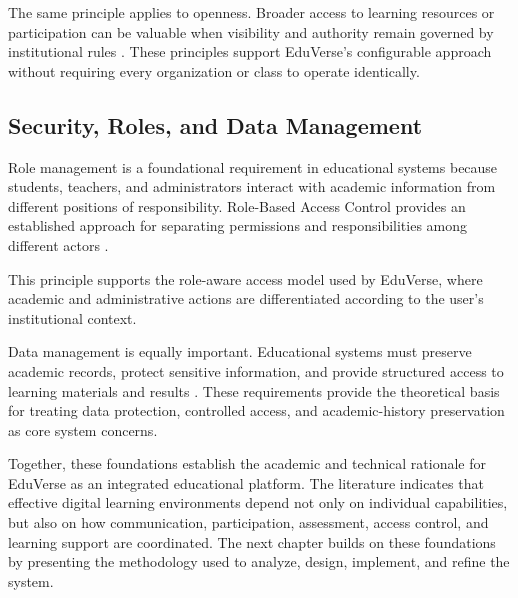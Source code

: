 The same principle applies to openness. Broader access to learning resources or
participation can be valuable when visibility and authority remain governed by
institutional rules \cite{oecd2023outlook}. These principles support EduVerse's
configurable approach without requiring every organization or class to operate
identically.

\subsection{Security, Roles, and Data Management}
\label{subsec:security_roles_and_data_management}

Role management is a foundational requirement in educational systems because
students, teachers, and administrators interact with academic information from
different positions of responsibility. Role-Based Access Control provides an
established approach for separating permissions and responsibilities among
different actors \cite{kabier2023rbac}.

This principle supports the role-aware access model used by EduVerse, where
academic and administrative actions are differentiated according to the user's
institutional context.

Data management is equally important. Educational systems must preserve
academic records, protect sensitive information, and provide structured access
to learning materials and results \cite{liu2023privacy,kabier2023rbac}. These
requirements provide the theoretical basis for treating data protection,
controlled access, and academic-history preservation as core system concerns.

Together, these foundations establish the academic and technical rationale for
EduVerse as an integrated educational platform. The literature indicates that
effective digital learning environments depend not only on individual
capabilities, but also on how communication, participation, assessment, access
control, and learning support are coordinated. The next chapter builds on these
foundations by presenting the methodology used to analyze, design, implement,
and refine the system.
